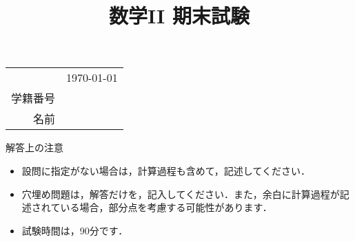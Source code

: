 \title{数学II 期末試験}
\date{}
\maketitle

\vspace*{-2cm}
\begin{table}[!h]
	\begin{flushright}
		\begin{tabular}{rc}
			\vspace*{0.1in} & \usdate\today\\
			学籍番号 & \vspace{0.1in} \\
			名前 & \vspace{0.1in} \\
		\end{tabular}
	\end{flushright}
\end{table}

\begin{itembox}[c]{解答上の注意}
	\begin{itemize}
		\item 設問に指定がない場合は，計算過程も含めて，記述してください．
		\item 穴埋め問題は，解答だけを，記入してください．また，余白に計算過程が記述されている場合，部分点を考慮する可能性があります．
		\item 試験時間は，90分です．
	\end{itemize}
\end{itembox}

